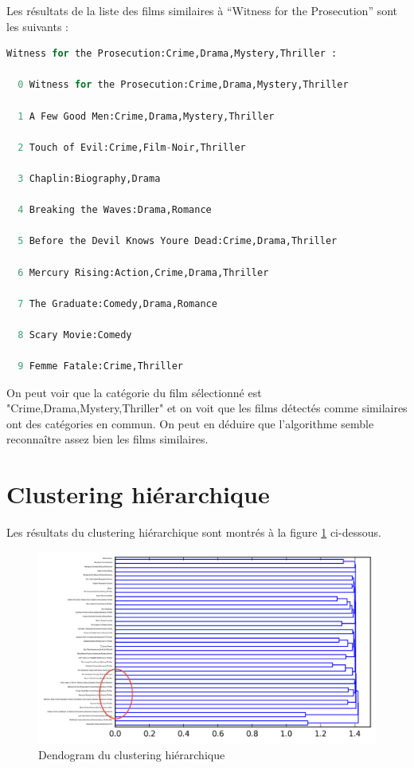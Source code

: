 Les résultats de la liste des films similaires à ``Witness for the Prosecution'' sont les suivants : \\

\begin{lstlisting}[language=python]
  Witness for the Prosecution:Crime,Drama,Mystery,Thriller :

  0 Witness for the Prosecution:Crime,Drama,Mystery,Thriller

  1 A Few Good Men:Crime,Drama,Mystery,Thriller

  2 Touch of Evil:Crime,Film-Noir,Thriller

  3 Chaplin:Biography,Drama

  4 Breaking the Waves:Drama,Romance

  5 Before the Devil Knows Youre Dead:Crime,Drama,Thriller

  6 Mercury Rising:Action,Crime,Drama,Thriller

  7 The Graduate:Comedy,Drama,Romance

  8 Scary Movie:Comedy

  9 Femme Fatale:Crime,Thriller
\end{lstlisting}

On peut voir que la catégorie du film sélectionné est "Crime,Drama,Mystery,Thriller" et on voit que les films détectés comme similaires ont des catégories en commun. On peut en déduire que l'algorithme semble reconnaître assez bien les films similaires.

\section{Clustering hiérarchique}

Les résultats du clustering hiérarchique sont montrés à la figure \ref{hierarchical} ci-dessous.

\begin{figure}[h]
  \centering
    \includegraphics[width=1\linewidth]{img/clustering50_tf_idf.png}
  \caption{Dendogram du clustering hiérarchique}
  \label{hierarchical}
\end{figure}

